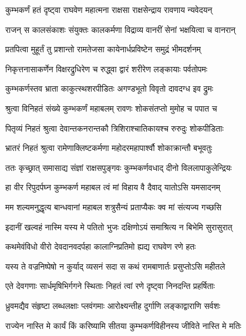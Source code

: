 
\twolineshloka
{कुम्भकर्णं हतं दृष्ट्वा राघवेण महात्मना}
{राक्षसा राक्षसेन्द्राय रावणाय न्यवेदयन्} %

\twolineshloka
{राजन् स कालसंकाशः संयुक्तः कालकर्मणा}
{विद्राव्य वानरीं सेनां भक्षयित्वा च वानरान्} %

\twolineshloka
{प्रतपित्वा मुहूर्तं तु प्रशान्तो रामतेजसा}
{कायेनार्धप्रविष्टेन समुद्रं भीमदर्शनम्} %

\twolineshloka
{निकृत्तनासाकर्णेन विक्षरद्रुधिरेण च}
{रुद्ध्वा द्वारं शरीरेण लङ्कायाः पर्वतोपमः} %

\twolineshloka
{कुम्भकर्णस्तव भ्राता काकुत्स्थशरपीडितः}
{अगण्डभूतो विवृतो दावदग्ध इव द्रुमः} %

\twolineshloka
{श्रुत्वा विनिहतं संख्ये कुम्भकर्णं महाबलम्}
{रावणः शोकसंतप्तो मुमोह च पपात च} %

\twolineshloka
{पितृव्यं निहतं श्रुत्वा देवान्तकनरान्तकौ}
{त्रिशिराश्चातिकायश्च रुरुदुः शोकपीडिताः} %

\twolineshloka
{भ्रातरं निहतं श्रुत्वा रामेणाक्लिष्टकर्मणा}
{महोदरमहापार्श्वौ शोकाक्रान्तौ बभूवतुः} %

\twolineshloka
{ततः कृच्छ्रात् समासाद्य संज्ञां राक्षसपुङ्गवः}
{कुम्भकर्णवधाद् दीनो विललापाकुलेन्द्रियः} %

\twolineshloka
{हा वीर रिपुदर्पघ्न कुम्भकर्ण महाबल}
{त्वं मां विहाय वै दैवाद् यातोऽसि यमसादनम्} %

\twolineshloka
{मम शल्यमनुद्धृत्य बान्धवानां महाबल}
{शत्रुसैन्यं प्रताप्यैकः क्व मां संत्यज्य गच्छसि} %

\twolineshloka
{इदानीं खल्वहं नास्मि यस्य मे पतितो भुजः}
{दक्षिणोऽयं समाश्रित्य न बिभेमि सुरासुरात्} %

\twolineshloka
{कथमेवंविधो वीरो देवदानवदर्पहा}
{कालाग्निप्रतिमो ह्यद्य राघवेण रणे हतः} %

\twolineshloka
{यस्य ते वज्रनिष्पेषो न कुर्याद् व्यसनं सदा}
{स कथं रामबाणार्तः प्रसुप्तोऽसि महीतले} %

\twolineshloka
{एते देवगणाः सार्धमृषिभिर्गगने स्थिताः}
{निहतं त्वां रणे दृष्ट्वा निनदन्ति प्रहर्षिताः} %

\twolineshloka
{ध्रुवमद्यैव संहृष्टा लब्धलक्षाः प्लवंगमाः}
{आरोक्ष्यन्तीह दुर्गाणि लङ्काद्वाराणि सर्वशः} %

\twolineshloka
{राज्येन नास्ति मे कार्यं किं करिष्यामि सीतया}
{कुम्भकर्णविहीनस्य जीविते नास्ति मे मतिः} %

